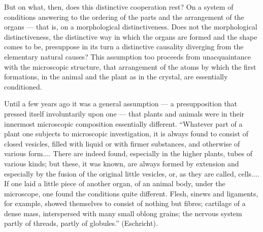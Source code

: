 \documentclass[12pt,a4paper]{book}
\begin{document}
But on what, then, does this distinctive cooperation rest? On a system of
conditions answering to the ordering of the parts and the arrangement of the
organs --- that is, on a morphological distinctiveness. Does not the
morphological distinctiveness, the distinctive way in which the organs are
formed and the shape comes to be, presuppose in its turn a distinctive
causality diverging from the elementary natural causes? This assumption too
proceeds from unacquaintance with the microscopic structure, that arrangement
of the atoms by which the first formations, in the animal and the plant as in
the crystal, are essentially conditioned.

Until a few years ago it was a general assumption --- a presupposition that
pressed itself involuntarily upon one --- that plants and animals were in their
innermost microscopic composition essentially different. ``Whatever part of a
plant one subjects to microscopic investigation, it is always found to consist
of closed vesicles, filled with liquid or with firmer substances, and otherwise
of various form.... There are indeed found, especially in the higher plants,
tubes of various kinds; but these, it was known, are always formed by extension
and especially by the fusion of the original little vesicles, or, as they are
called, cells.... If one laid a little piece of another organ, of an animal
body, under the microscope, one found the conditions quite different. Flesh,
sinews and ligaments, for example, showed themselves to consist of nothing but
fibres; cartilage of a dense mass, interspersed with many small oblong grains;
the nervous system partly of threads, partly of globules.'' (Eschricht).
\end{document}
